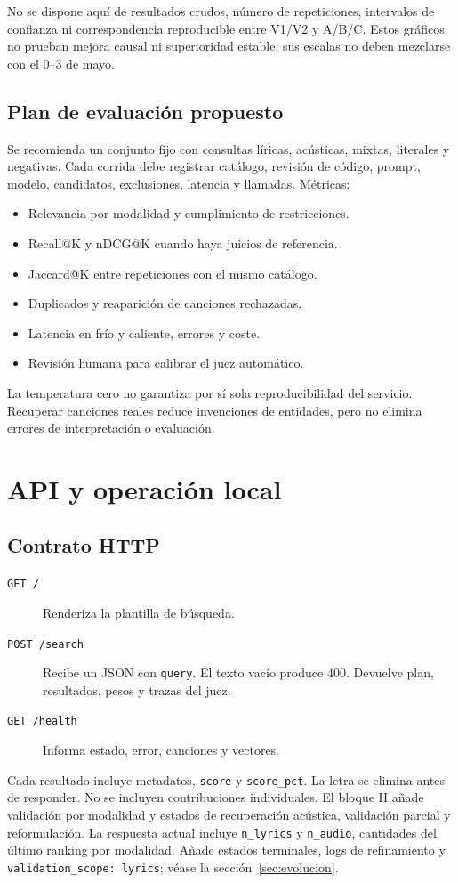 \documentclass[11pt,a4paper]{article}
\newcommand{\code}[1]{\nolinkurl{#1}}
\begin{document}
No se dispone aquí de resultados crudos, número de repeticiones, intervalos de confianza ni correspondencia reproducible entre V1/V2 y A/B/C. Estos gráficos no prueban mejora causal ni superioridad estable; sus escalas no deben mezclarse con el 0--3 de mayo.

\subsection{Plan de evaluación propuesto}
Se recomienda un conjunto fijo con consultas líricas, acústicas, mixtas, literales y negativas. Cada corrida debe registrar catálogo, revisión de código, prompt, modelo, candidatos, exclusiones, latencia y llamadas. Métricas:
\begin{itemize}
\item Relevancia por modalidad y cumplimiento de restricciones.
\item Recall@K y nDCG@K cuando haya juicios de referencia.
\item Jaccard@K entre repeticiones con el mismo catálogo.
\item Duplicados y reaparición de canciones rechazadas.
\item Latencia en frío y caliente, errores y coste.
\item Revisión humana para calibrar el juez automático.
\end{itemize}
La temperatura cero no garantiza por sí sola reproducibilidad del servicio. Recuperar canciones reales reduce invenciones de entidades, pero no elimina errores de interpretación o evaluación.

\section{API y operación local}
\subsection{Contrato HTTP}
\begin{description}
\item[\code{GET /}] Renderiza la plantilla de búsqueda.
\item[\code{POST /search}] Recibe un JSON con \code{query}. El texto vacío produce 400. Devuelve plan, resultados, pesos y trazas del juez.
\item[\code{GET /health}] Informa estado, error, canciones y vectores.
\end{description}
Cada resultado incluye metadatos, \code{score} y \code{score_pct}. La letra se elimina antes de responder. No se incluyen contribuciones individuales. El bloque II añade validación por modalidad y estados de recuperación acústica, validación parcial y reformulación. La respuesta actual incluye \code{n_lyrics} y \code{n_audio}, cantidades del último ranking por modalidad. Añade estados terminales, logs de refinamiento y \code{validation_scope: lyrics}; véase la sección~\ref{sec:evolucion}.
\end{document}

